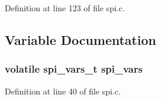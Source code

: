 Definition at line 123 of file spi.\+c.



\subsection{Variable Documentation}
\subsubsection[{\texorpdfstring{spi\+\_\+vars}{spi_vars}}]{\setlength{\rightskip}{0pt plus 5cm}volatile {\bf spi\+\_\+vars\+\_\+t} spi\+\_\+vars}\hypertarget{iot-lab___m3_2spi_8c_a3fc8dc89994006cd0925b1b0efb0f189}{}\label{iot-lab___m3_2spi_8c_a3fc8dc89994006cd0925b1b0efb0f189}


Definition at line 40 of file spi.\+c.

